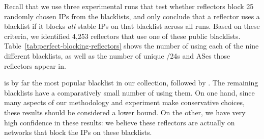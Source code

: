 Recall that we use three experimental runs that test whether
reflectors block 25 randomly chosen IPs from the blacklists, and only
conclude that a reflector uses a blacklist if it blocks {\em all}
stable IPs on that blacklist across all runs.  Based on these criteria,
we identified 4,253 reflectors that use one of these public
blacklists.  Table~\ref{tab:perfect-blocking-reflectors} shows the
number of {} using each of the nine different blacklists,
as well as the number of unique /24s and ASes those reflectors appear
in.

{\spamhausdrop} is by far the most popular blacklist in our
collection, followed by {\spamhausedrop}.  The remaining blacklists
have a comparatively small number of {} using them.  On one
hand, since many aspects of our methodology and experiment make
conservative choices, these results should be considered a lower
bound.  On the other, we have very high confidence in these results:
we believe these reflectors are actually on networks that block the
IPs on these blacklists.




